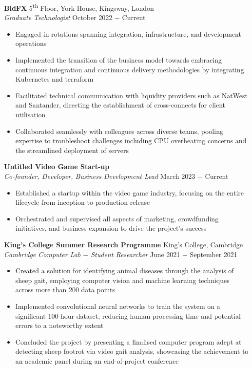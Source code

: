 \documentclass{article}
\begin{document}
\textbf{BidFX} \hfill 5\textsuperscript{th} Floor, York House, Kingsway, London\\
\textit{Graduate Technologist} \hfill October 2022 $-$ Current
\begin{itemize}
    \item Engaged in rotations spanning integration, infrastructure, and development operations
    \item Implemented the transition of the business model towards embracing continuous integration and continuous delivery methodologies by integrating Kubernetes and terraform
    \item Facilitated technical communication with liquidity providers such as NatWest and Santander, directing the establishment of cross-connects for client utilisation
    \item Collaborated seamlessly with colleagues across diverse teams, pooling expertise to troubleshoot challenges including CPU overheating concerns and the streamlined deployment of servers
\end{itemize} \medskip

\textbf{Untitled Video Game Start-up}\\
\textit{Co-founder, Developer, Business Development Lead} \hfill March 2023 $-$ Current
\begin{itemize}
    \item Established a startup within the video game industry, focusing on the entire lifecycle from inception to production release
    \item Orchestrated and supervised all aspects of marketing, crowdfunding initiatives, and business expansion to drive the project's success
\end{itemize} \medskip

\textbf{King's College Summer Research Programme} \hfill King's College, Cambridge \\
\textit{Cambridge Computer Lab $-$ Student Researcher} \hfill June 2021 $-$ September 2021
\begin{itemize}
    \item Created a solution for identifying animal diseases through the analysis of sheep gait, employing computer vision and machine learning techniques across more than 200 data points
    \item Implemented convolutional neural networks to train the system on a significant 100-hour dataset, reducing human processing time and potential errors to a noteworthy extent
    \item Concluded the project by presenting a finalised computer program adept at detecting sheep footrot via video gait analysis, showcasing the achievement to an academic panel during an end-of-project conference%
\end{itemize} \medskip
\end{document}

